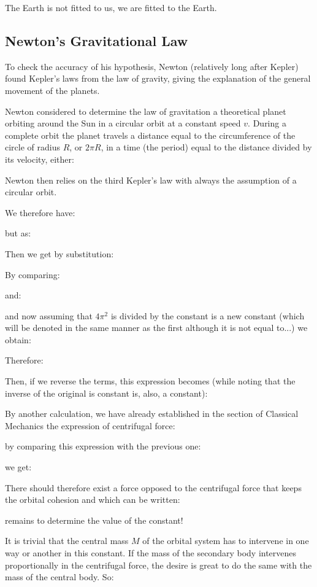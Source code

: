 	\begin{fquote}The Earth is not fitted to us, we are fitted to the Earth.
 	\end{fquote}
		
	\pagebreak
	\subsection{Newton's Gravitational Law}\label{newton gravitational law}
	To check the accuracy of his hypothesis, Newton (relatively long after Kepler) found Kepler's laws from the law of gravity, giving the explanation of the general movement of the planets.
	
	Newton considered to determine the law of gravitation a theoretical planet orbiting around the Sun in a circular orbit at a constant speed $v$. During a complete orbit the planet travels a distance equal to the circumference of the circle of radius $R$, or $2\pi R$, in a time (the period) equal to the distance divided by its velocity, either:
	
	Newton then relies on the third Kepler's law with always the assumption of a circular orbit.
	
	We therefore have:
	
	but as:
	
	Then we get by substitution:
	
	By comparing:
	
	and:
	
	and now assuming that $4\pi^2$ is divided by the constant is a new constant (which will be denoted in the same manner as the first although it is not equal to...) we obtain:
	
	Therefore:
	
	Then, if we reverse the terms, this expression becomes (while noting that the inverse of the original is constant is, also, a constant):
	
	By another calculation, we have already established in the section of Classical Mechanics the expression of centrifugal force:
	
	by comparing this expression with the previous one:
	
	we get:
	
	There should therefore exist a force opposed to the centrifugal force that keeps the orbital cohesion and which can be written:
	
	remains to determine the value of the constant!
	
	It is trivial that the central mass $M$ of the orbital system has to intervene in one way or another in this constant. If the mass of the secondary body intervenes proportionally in the centrifugal force, the desire is great to do the same with the mass of the central body. So:
	
